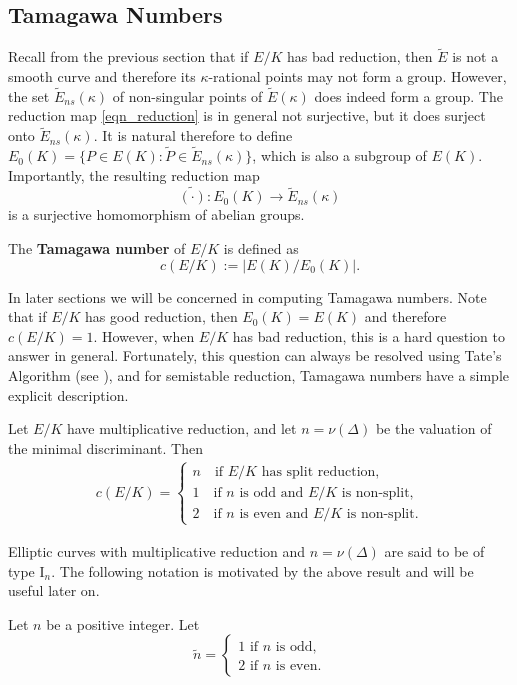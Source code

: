 
\subsection{Tamagawa Numbers} \label{subs_tamagawa}

Recall from the previous section that if $E/K$ has bad reduction, then $\tilde{E}$ is not a smooth curve and therefore its $\kappa$-rational points may not form a group. However, the set $\tilde{E}_{ns}(\kappa)$ of non-singular points of $\tilde{E}(\kappa)$ does indeed form a group. The reduction map \eqref{eqn_reduction} is in general not surjective, but it does surject onto $\tilde{E}_{ns}(\kappa)$. It is natural therefore to define $E_0(K)=\{P\in E(K):\widetilde{P}\in\tilde{E}_{ns}(\kappa)\}$, which is also a subgroup of $E(K)$. Importantly, the resulting reduction map 
$$\widetilde{(\cdot)}:E_0(K)\longrightarrow \tilde{E}_{ns}(\kappa)$$
is a surjective homomorphism of abelian groups.
\begin{defn}
    The \textbf{Tamagawa number} of $E/K$ is defined as
    \begin{equation}
        c(E/K):=|E(K)/E_0(K)|.
    \end{equation}
\end{defn}
In later sections we will be concerned in computing Tamagawa numbers. Note that if $E/K$ has good reduction, then $E_0(K)=E(K)$ and therefore $c(E/K)=1$. However, when $E/K$ has bad reduction, this is a hard question to answer in general. Fortunately, this question can always be resolved using Tate's Algorithm (see \cite[\S IV.9]{S2}), and for semistable reduction, Tamagawa numbers have a simple explicit description.

\begin{lemma}\label{lem_mult_tam}
    Let $E/K$ have multiplicative reduction, and let $n=\nu(\Delta)$ be the valuation of the minimal discriminant. Then
    \begin{align*}
        c(E/K)=
        \begin{cases}
            n \quad\text{if $E/K$ has split reduction,}\\
            1 \quad\text{if $n$ is odd and $E/K$ is non-split,}\\
            2 \quad\text{if $n$ is even and $E/K$ is non-split}.
        \end{cases}    
    \end{align*}
\end{lemma}

Elliptic curves with multiplicative reduction and $n=\nu(\Delta)$ are said to be of type $\mathrm{I}_n$. The following notation is motivated by the above result and will be useful later on.
\begin{notation}\label{not_n}
    Let $n$ be a positive integer. Let 
    \[
        \tilde{n}=
        \begin{cases}
            1 \text{ if } n \text{ is odd,}\\
            2 \text{ if } n \text{ is even.}
        \end{cases}
    \]
    
\end{notation}


